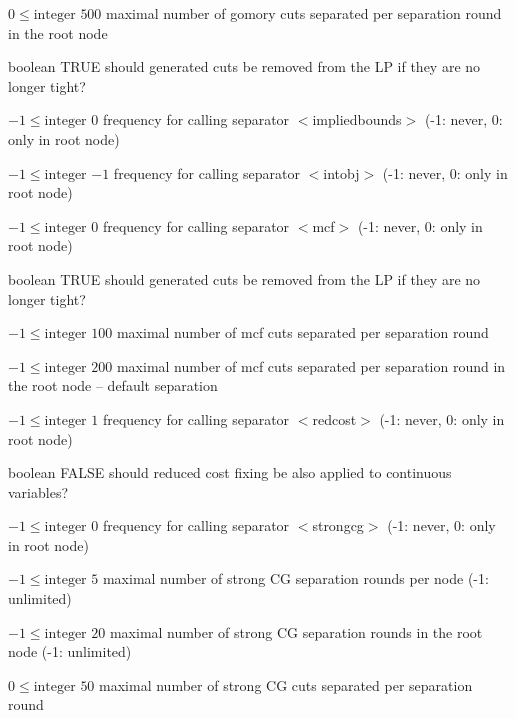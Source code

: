 %
{$0\leq\textrm{integer}$}%
{$500$}%
{maximal number of gomory cuts separated per separation round in the root node}%
{}

%
{boolean}%
{TRUE}%
{should generated cuts be removed from the LP if they are no longer tight?}%
{}

%
{$-1\leq\textrm{integer}$}%
{$0$}%
{frequency for calling separator $<$impliedbounds$>$ (-1: never, 0: only in root node)}%
{}

%
{$-1\leq\textrm{integer}$}%
{$-1$}%
{frequency for calling separator $<$intobj$>$ (-1: never, 0: only in root node)}%
{}

%
{$-1\leq\textrm{integer}$}%
{$0$}%
{frequency for calling separator $<$mcf$>$ (-1: never, 0: only in root node)}%
{}

%
{boolean}%
{TRUE}%
{should generated cuts be removed from the LP if they are no longer tight?}%
{}

%
{$-1\leq\textrm{integer}$}%
{$100$}%
{maximal number of mcf cuts separated per separation round}%
{}

%
{$-1\leq\textrm{integer}$}%
{$200$}%
{maximal number of mcf cuts separated per separation round in the root node  -- default separation}%
{}

%
{$-1\leq\textrm{integer}$}%
{$1$}%
{frequency for calling separator $<$redcost$>$ (-1: never, 0: only in root node)}%
{}

%
{boolean}%
{FALSE}%
{should reduced cost fixing be also applied to continuous variables?}%
{}

%
{$-1\leq\textrm{integer}$}%
{$0$}%
{frequency for calling separator $<$strongcg$>$ (-1: never, 0: only in root node)}%
{}

%
{$-1\leq\textrm{integer}$}%
{$5$}%
{maximal number of strong CG separation rounds per node (-1: unlimited)}%
{}

%
{$-1\leq\textrm{integer}$}%
{$20$}%
{maximal number of strong CG separation rounds in the root node (-1: unlimited)}%
{}

%
{$0\leq\textrm{integer}$}%
{$50$}%
{maximal number of strong CG cuts separated per separation round}%
{}

